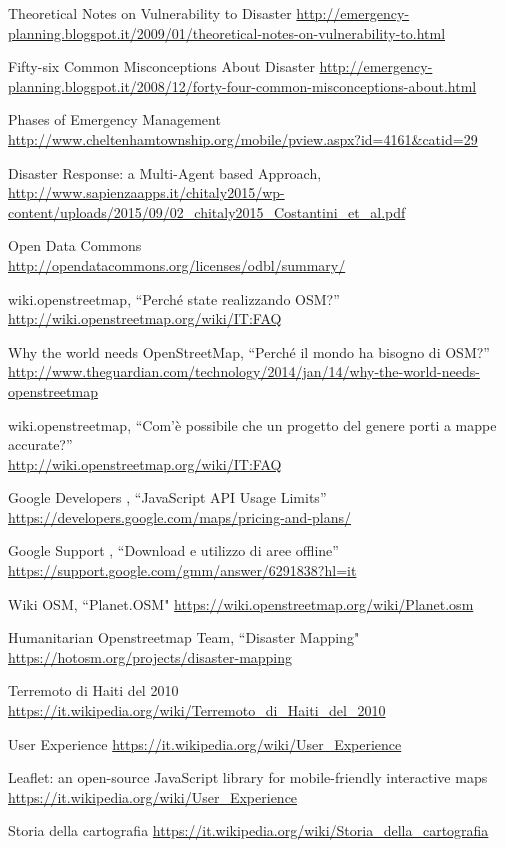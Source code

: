 \begin{thebibliography}{99}

Theoretical Notes on Vulnerability to Disaster
\url{http://emergency-planning.blogspot.it/2009/01/theoretical-notes-on-vulnerability-to.html}

Fifty-six Common Misconceptions About Disaster
\url{http://emergency-planning.blogspot.it/2008/12/forty-four-common-misconceptions-about.html}

Phases of Emergency Management
\url{http://www.cheltenhamtownship.org/mobile/pview.aspx?id=4161&catid=29}

Disaster Response: a Multi-Agent based Approach,
\url{http://www.sapienzaapps.it/chitaly2015/wp-content/uploads/2015/09/02_chitaly2015_Costantini_et_al.pdf}

Open Data Commons  \\
\url{http://opendatacommons.org/licenses/odbl/summary/}

wiki.openstreetmap, ``Perché state realizzando OSM?'' \\
\url{http://wiki.openstreetmap.org/wiki/IT:FAQ}

Why the world needs OpenStreetMap, ``Perché il mondo ha bisogno di OSM?''
\url{http://www.theguardian.com/technology/2014/jan/14/why-the-world-needs-openstreetmap}

wiki.openstreetmap, ``Com'è possibile che un progetto del genere porti a mappe accurate?'' \\
\url{http://wiki.openstreetmap.org/wiki/IT:FAQ}

Google Developers ,  ``JavaScript API Usage Limits''
\url{https://developers.google.com/maps/pricing-and-plans/}


Google Support ,  ``Download e utilizzo di aree offline''
\url{https://support.google.com/gmm/answer/6291838?hl=it}

Wiki OSM,  ``Planet.OSM"
\url{https://wiki.openstreetmap.org/wiki/Planet.osm}

Humanitarian Openstreetmap Team,  ``Disaster Mapping"
\url{https://hotosm.org/projects/disaster-mapping}

Terremoto di Haiti del 2010
\url{https://it.wikipedia.org/wiki/Terremoto_di_Haiti_del_2010}

User Experience
\url{https://it.wikipedia.org/wiki/User_Experience}

Leaflet: an open-source JavaScript library for mobile-friendly interactive maps
\url{https://it.wikipedia.org/wiki/User_Experience}

Storia della cartografia
\url{https://it.wikipedia.org/wiki/Storia_della_cartografia}
 




\end{thebibliography}




